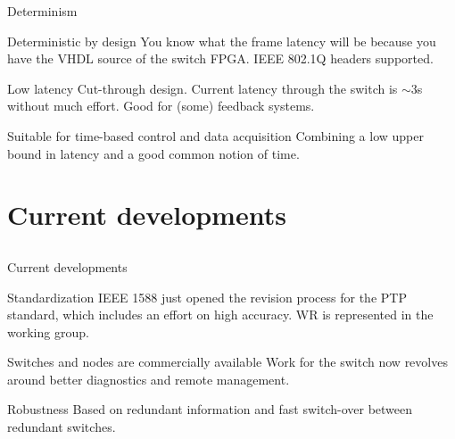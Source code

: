 \documentclass[compress, red]{beamer}
\begin{document}
\begin{frame}{Determinism}
\pause
 \begin{block}{Deterministic by design}
  You know what the frame latency will be because you have the VHDL
  source of the switch FPGA. IEEE 802.1Q headers supported.
 \end{block}
\pause
 \begin{block}{Low latency}
  Cut-through design. Current latency through the switch is
  $\sim$3\textmu s without much effort. Good for (some) feedback systems.
 \end{block}
\pause 
 \begin{block}{Suitable for time-based control and data acquisition}
  Combining a low upper bound in latency and a good common notion of time. 
 \end{block}

\end{frame}

\section{Current developments}
\subsection{}

\begin{frame}{Current developments}
\pause
 \begin{block}{Standardization}
  IEEE 1588 just opened the revision process for the PTP standard,
  which includes an effort on high accuracy. WR is represented in the
  working group.
 \end{block}
\pause
 \begin{block}{Switches and nodes are commercially available}
  Work for the switch now revolves around better diagnostics and
  remote management.
 \end{block}
\pause
 \begin{block}{Robustness}
  Based on redundant information and fast switch-over between
  redundant switches. 
 \end{block}
\end{frame}
\end{document}
